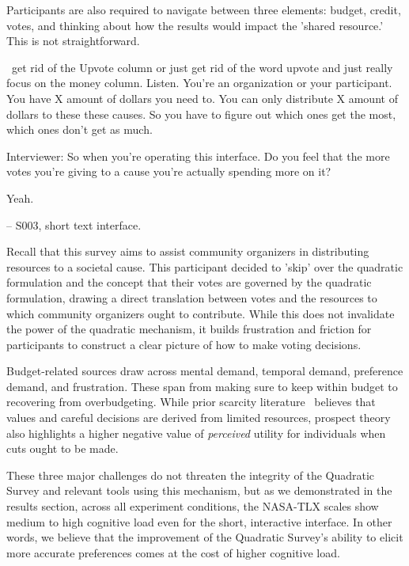 Participants are also required to navigate between three elements: budget, credit, votes, and thinking about how the results would impact the 'shared resource.' This is not straightforward. 

\begin{displayquote}

~\bracketellipsis get rid of the Upvote column or just get rid of the word upvote and just really focus on the money column. Listen. You're an organization or your participant. You have X amount of dollars you need to. You can only distribute X amount of dollars to these these causes. So you have to figure out which ones get the most, which ones don't get as much.~\bracketellipsis 

Interviewer: So when you're operating this interface. Do you feel that the more votes you're giving to a cause you're actually spending more on it?

Yeah.
       
\noindent \hfill -- S003, short text interface.
\end{displayquote}
Recall that this survey aims to assist community organizers in distributing resources to a societal cause. This participant decided to 'skip' over the quadratic formulation and the concept that their votes are governed by the quadratic formulation, drawing a direct translation between votes and the resources to which community organizers ought to contribute. While this does not invalidate the power of the quadratic mechanism, it builds frustration and friction for participants to construct a clear picture of how to make voting decisions.

Budget-related sources draw across mental demand, temporal demand, preference demand, and frustration. These span from making sure to keep within budget to recovering from overbudgeting. While prior scarcity literature~\cite{Shah2015a} believes that values and careful decisions are derived from limited resources, prospect theory~\cite{kahnemanProspectTheoryAnalysis1979} also highlights a higher negative value of \textit{perceived} utility for individuals when cuts ought to be made.

These three major challenges do not threaten the integrity of the Quadratic Survey and relevant tools using this mechanism, but as we demonstrated in the results section, across all experiment conditions, the NASA-TLX scales show medium to high cognitive load even for the short, interactive interface. In other words, we believe that the improvement of the Quadratic Survey's ability to elicit more accurate preferences comes at the cost of higher cognitive load.


